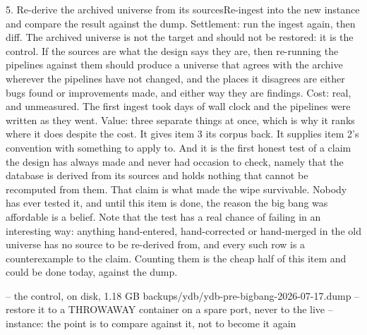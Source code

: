 \begin{Open}{5. Re-derive the archived universe from its sources}{Re-ingest \labLineageSources{} into the new instance and compare the result against the dump.}
Settlement: run the ingest again, then diff. The archived universe is not the target and should not be restored: it is the control. If the sources are what the design says they are, then re-running the pipelines against them should produce a universe that agrees with the archive wherever the pipelines have not changed, and the places it disagrees are either bugs found or improvements made, and either way they are findings. Cost: real, and unmeasured. The first ingest took days of wall clock and the pipelines were written as they went. Value: three separate things at once, which is why it ranks where it does despite the cost. It gives item 3 its corpus back. It supplies item 2's convention with something to apply to. And it is the first honest test of a claim the design has always made and never had occasion to check, namely that the database is derived from its sources and holds nothing that cannot be recomputed from them. That claim is what made the wipe survivable. Nobody has ever tested it, and until this item is done, the reason the big bang was affordable is a belief. Note that the test has a real chance of failing in an interesting way: anything hand-entered, hand-corrected or hand-merged in the old universe has no source to be re-derived from, and every such row is a counterexample to the claim. Counting them is the cheap half of this item and could be done today, against the dump.
\begin{Check}
-- the control, on disk, 1.18 GB
backups/ydb/ydb-pre-bigbang-2026-07-17.dump
-- restore it to a THROWAWAY container on a spare port, never to the live
-- instance: the point is to compare against it, not to become it again
\end{Check}
\end{Open}

